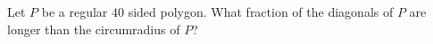 Let $P$ be a regular $40$ sided polygon. What fraction of the diagonals of $P$ are longer than the circumradius of $P$?
